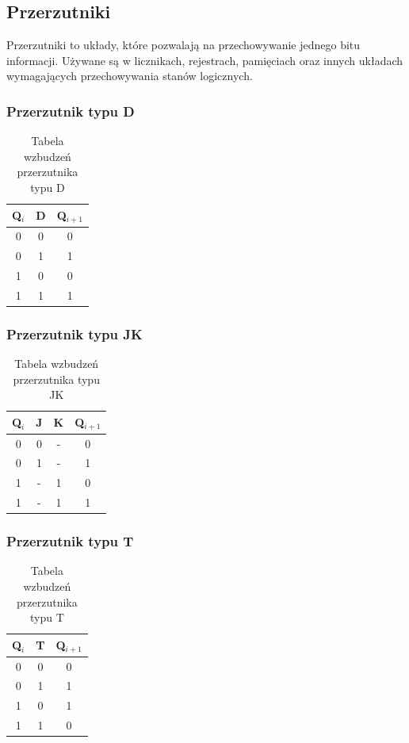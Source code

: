 \documentclass{article}
\begin{document}
	\pagebreak
	
    \subsection{ Przerzutniki}

    Przerzutniki to układy, które pozwalają na przechowywanie jednego bitu informacji. Używane są w licznikach, rejestrach, pamięciach oraz innych układach wymagających przechowywania stanów logicznych\cite{wiki-flip}.

    \subsubsection{Przerzutnik typu D}
    \begin{table}[H]
    	\centering
    	\begin{tabular}{|c|c|c|}
    		\hline
    		\textbf{Q$_i$} & \textbf{D} & \textbf{Q$_{i+1}$} \\ \hline
    		0 & 0 & 0 \\ 
    		0 & 1 & 1 \\ 
    		1 & 0 & 0 \\ 
    		1 & 1 & 1 \\ 
    		\hline
    	\end{tabular}
    	\caption{Tabela wzbudzeń przerzutnika typu D}
    \end{table}
    
    \subsubsection{Przerzutnik typu JK}
    \begin{table}[H]
    	\centering
    	\begin{tabular}{|c|c|c|c|}
    		\hline
    		\textbf{Q$_i$} & \textbf{J} & \textbf{K} & \textbf{Q$_{i+1}$} \\ \hline
    		0 & 0 & - & 0 \\ 
    		0 & 1 & - & 1 \\ 
    		1 & - & 1 & 0 \\ 
    		1 & - & 1 & 1 \\ 
    		\hline
    	\end{tabular}
    	\caption{Tabela wzbudzeń przerzutnika typu JK}
    \end{table}
    
    \subsubsection{Przerzutnik typu T}
    \begin{table}[H]
    	\centering
    	\begin{tabular}{|c|c|c|}
    		\hline
    		\textbf{Q$_i$} & \textbf{T} & \textbf{Q$_{i+1}$} \\ \hline
    		0 & 0 & 0 \\ 
    		0 & 1 & 1 \\ 
    		1 & 0 & 1 \\ 
    		1 & 1 & 0 \\ 
    		\hline
    	\end{tabular}
    	\caption{Tabela wzbudzeń przerzutnika typu T}
    \end{table}
    
\end{document}

